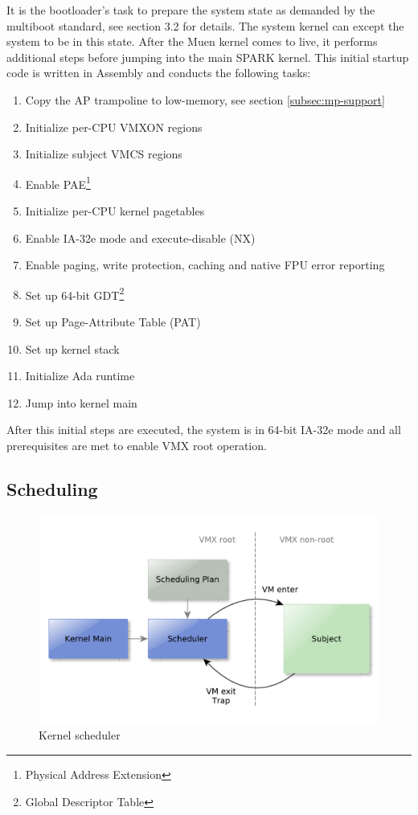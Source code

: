 It is the bootloader's task to prepare the system state as demanded by the
multiboot standard, see \cite{multiboot} section 3.2 for details. The system
kernel can except the system to be in this state. After the Muen kernel comes to
live, it performs additional steps before jumping into the main SPARK kernel.
This initial startup code is written in Assembly and conducts the following
tasks:
\begin{enumerate}
	\item Copy the AP trampoline to low-memory, see section
		\ref{subsec:mp-support} \item Initialize per-CPU VMXON regions
	\item Initialize subject VMCS regions
	\item Enable PAE\footnote{Physical Address Extension}
	\item Initialize per-CPU kernel pagetables
	\item Enable IA-32e mode and execute-disable (NX)
	\item Enable paging, write protection, caching and native FPU error
		reporting
	\item Set up 64-bit GDT\footnote{Global Descriptor Table}
	\item Set up Page-Attribute Table (PAT)
	\item Set up kernel stack
	\item Initialize Ada runtime
	\item Jump into kernel main
\end{enumerate}
After this initial steps are executed, the system is in 64-bit IA-32e mode and
all prerequisites are met to enable VMX root operation.

\subsection{Scheduling}
\begin{figure}[h]
	\centering
	\includegraphics[scale=0.6]{images/scheduler-overview}
	\caption{Kernel scheduler}
	\label{fig:scheduler-overview}
\end{figure}

